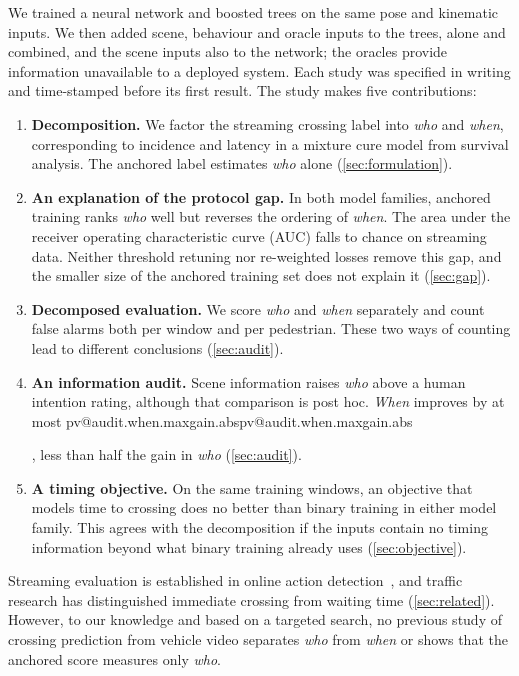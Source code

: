 \documentclass[10pt,a4paper,twocolumn]{article}
\makeatletter
\newcommand{\V}[1]{\ifcsname pv@#1\endcsname\csname pv@#1\endcsname\else
  \PackageError{numbers}{Unknown number key: #1}{Run figures/make_tables.py}\fi}
\makeatother
\begin{document}
We trained a neural network and boosted trees on the same pose and kinematic
inputs. We then added scene, behaviour and oracle inputs to the trees, alone
and combined, and the scene inputs also to the network; the oracles provide
information unavailable to a deployed system. Each study was specified in
writing and time-stamped before its first result. The study makes five
contributions:
\begin{enumerate}\setlength{\itemsep}{0pt}
  \item \textbf{Decomposition.} We factor the streaming crossing label into
  \emph{who} and \emph{when}, corresponding to incidence and latency in a
  mixture cure model from survival analysis. The anchored label estimates
  \emph{who} alone (\cref{sec:formulation}).
  \item \textbf{An explanation of the protocol gap.} In both model families,
  anchored training ranks \emph{who} well but reverses the ordering of
  \emph{when}. The area under the receiver operating characteristic curve
  (AUC) falls to chance on streaming data. Neither threshold retuning nor
  re-weighted losses remove this gap, and the smaller size of the anchored
  training set does not explain it (\cref{sec:gap}).
  \item \textbf{Decomposed evaluation.} We score \emph{who} and \emph{when}
  separately and count false alarms both per window and per pedestrian. These
  two ways of counting lead to different conclusions (\cref{sec:audit}).
  \item \textbf{An information audit.} Scene information raises \emph{who}
  above a human intention rating, although that comparison is post hoc.
  \emph{When} improves by at most \V{audit.when.maxgain.abs}, less than half
  the gain in \emph{who} (\cref{sec:audit}).
  \item \textbf{A timing objective.} On the same training windows, an
  objective that models time to crossing does no better than binary training
  in either model family. This agrees with the decomposition if the inputs
  contain no timing information beyond what binary training already uses
  (\cref{sec:objective}).
\end{enumerate}
Streaming evaluation is established in online action
detection~\cite{degeest2016oad,shou2018odas}, and traffic research has
distinguished immediate crossing from waiting time (\cref{sec:related}).
However, to our knowledge and based on a targeted search, no previous study of
crossing prediction from vehicle video separates \emph{who} from \emph{when} or
shows that the anchored score measures only \emph{who}.
\end{document}
